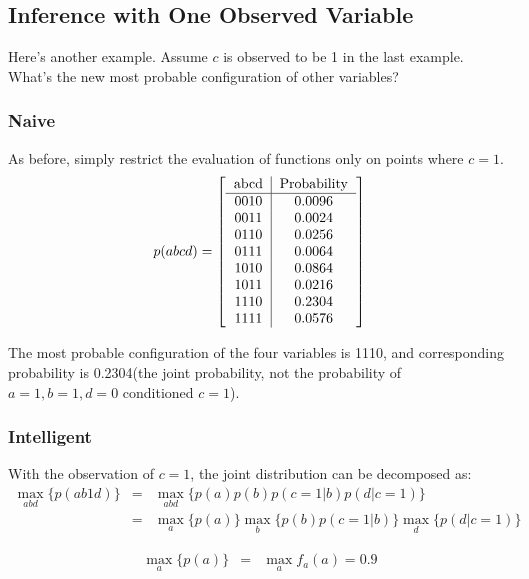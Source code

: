 \documentclass[11pt,a4paper]{article}
\begin{document}
\subsection{Inference with One Observed Variable}

Here's another example. Assume $c$ is observed to be 1 in 
the last example. What's the new most probable configuration of 
other variables? 

\subsubsection{Naive}
As before, simply restrict the evaluation of functions only 
on points where $c=1$. 
\begin{equation}
p(abcd)=\left[ 
\begin{tabular}{c|c}
abcd & Probability \\
\hline
  0010 & 0.0096 \\ 
  0011 & 0.0024 \\ 
  0110 & 0.0256 \\ 
  0111 & 0.0064 \\ 
  1010 & 0.0864 \\ 
  1011 & 0.0216 \\ 
  1110 & 0.2304 \\ 
  1111 & 0.0576 \\ 
\end{tabular} \right]
\end{equation}

The most probable configuration of the four variables is 1110, and 
corresponding probability is 0.2304(the joint probability, not the probability
of $a=1,b=1,d=0$ conditioned $c=1$). 

\subsubsection{Intelligent}

With the observation of $c=1$, the joint distribution can be decomposed as:
\begin{eqnarray}
\max_{abd} \{ p(ab1d) \} &=& \max_{abd} \{ p(a)p(b)p(c=1|b)p(d|c=1) \} \\
&=& \max_{a} \{ p(a) \} \max_{b} \{p(b)p(c=1|b)\} \max_{d} \{p(d|c=1) \} 
\end{eqnarray}

\begin{eqnarray}
\max_{a} \{ p(a) \} &=& \max_{a}{f_a(a)} = 0.9 
\end{eqnarray}
\end{document}
